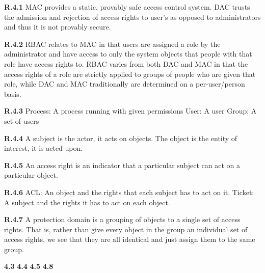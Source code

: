 \documentclass{report}
\begin{document}
{\bf R.4.1} MAC provides a static, provably safe access control system. DAC
trusts the admission and rejection of access rights to user's as opposed to
administrators and thus it is not provably secure.

{\bf R.4.2} RBAC relates to MAC in that users are assigned a role by the
administrator and have access to only the system objects that people with that
role have access rights to. RBAC varies from both DAC and MAC in that the access
rights of a role are strictly applied to groups of people who are given that
role, while DAC and MAC traditionally are determined on a per-user/person basis.

{\bf R.4.3} 
Process: A process running with given permissions
User: A user
Group: A set of users

{\bf R.4.4} A subject is the actor, it acts on objects. The object is the entity
of interest, it is acted upon.

{\bf R.4.5} An access right is an indicator that a particular subject can act on
a particular object.

{\bf R.4.6}
ACL: An object and the rights that each subject has to act on it.
Ticket: A subject and the rights it has to act on each object.

{\bf R.4.7}
A protection domain is a grouping of objects to a single set of access rights.
That is, rather than give every object in the group an individual set of access
rights, we see that they are all identical and just assign them to the same
group.

{\bf 4.3}
{\bf 4.4}
{\bf 4.5}
{\bf 4.8}

\end{document}
